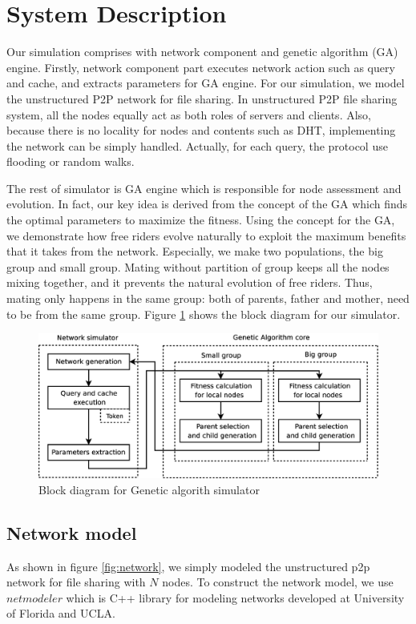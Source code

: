 \documentclass[12pt,journal,draftcls,letterpaper,onecolumn]{IEEEtran}
\begin{document}
\section{System Description}\label{sec:system}
Our simulation comprises with network component and genetic algorithm (GA) engine.
Firstly, network component part executes network action such as query and cache, and
extracts parameters for GA engine. For our simulation, we model the unstructured P2P
network for file sharing\cite{ek:survey}. In unstructured P2P file sharing system, all the nodes equally act
as both roles of servers and clients. Also, because there is no locality for nodes and contents
such as DHT, implementing the network can be simply handled. Actually, for each query, the
protocol use flooding or random walks.

The rest of simulator is GA engine which is responsible for node assessment and
evolution. In fact, our key idea is derived from the concept of the GA which finds the optimal
parameters to maximize the fitness\cite{genetic}. Using the concept for the GA, we demonstrate how
free riders evolve naturally to exploit the maximum benefits that it takes from the network.
Especially, we make two populations, the big group and small group. Mating without
partition of group keeps all the nodes mixing together, and it prevents the natural evolution of
free riders. Thus, mating only happens in the same group: both of parents, father and mother,
need to be from the same group. Figure \ref{fig:simblock} shows the block diagram for our simulator.

\begin{figure}
\centering
\includegraphics[width=5.2in]{simblock}
\caption{Block diagram for Genetic algorith simulator} 
\label{fig:simblock}
\end{figure}

\subsection{Network model}\label{sec:netmodel}
As shown in figure \ref{fig:network}, we simply modeled the unstructured p2p network for file sharing with
$N$ nodes. To construct the network model, we use $netmodeler$ which is C++ library for
modeling networks developed at University of Florida and UCLA\cite{netmodeler}.
\end{document}
